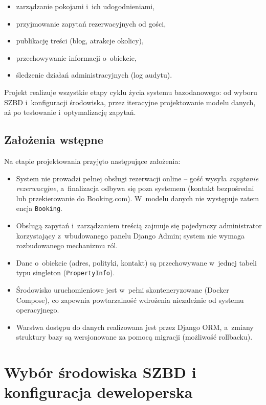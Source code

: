 \documentclass[12pt,a4paper]{article}
\begin{document}
\begin{itemize}[nosep]
  \item zarządzanie pokojami i~ich udogodnieniami,
  \item przyjmowanie zapytań rezerwacyjnych od gości,
  \item publikację treści (blog, atrakcje okolicy),
  \item przechowywanie informacji o~obiekcie,
  \item śledzenie działań administracyjnych (log audytu).
\end{itemize}

Projekt realizuje wszystkie etapy cyklu życia systemu bazodanowego: od wyboru SZBD
i~konfiguracji środowiska, przez iteracyjne projektowanie modelu danych, aż po
testowanie i~optymalizację zapytań.

\subsection{Założenia wstępne}

Na etapie projektowania przyjęto następujące założenia:

\begin{itemize}[nosep]
  \item System nie prowadzi pełnej obsługi rezerwacji online -- gość wysyła
    \emph{zapytanie rezerwacyjne}, a~finalizacja odbywa się poza systemem
    (kontakt bezpośredni lub przekierowanie do Booking.com). W~modelu danych
    nie występuje zatem encja \texttt{Booking}.
  \item Obsługą zapytań i~zarządzaniem treścią zajmuje się pojedynczy
    administrator korzystający z~wbudowanego panelu Django Admin; system nie
    wymaga rozbudowanego mechanizmu ról.
  \item Dane o~obiekcie (adres, polityki, kontakt) są przechowywane w~jednej
    tabeli typu singleton (\texttt{PropertyInfo}).
  \item Środowisko uruchomieniowe jest w~pełni skonteneryzowane (Docker Compose),
    co zapewnia powtarzalność wdrożenia niezależnie od systemu operacyjnego.
  \item Warstwa dostępu do danych realizowana jest przez Django ORM, a~zmiany
    struktury bazy są wersjonowane za pomocą migracji (możliwość rollbacku).
\end{itemize}

\section{Wybór środowiska SZBD i konfiguracja deweloperska}
\end{document}
